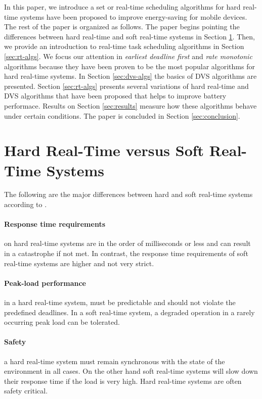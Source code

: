\documentclass[10pt,article]{IEEEtran}
\begin{document}
In this paper, we introduce a set or real-time scheduling algorithms for hard real-time systems have been proposed to improve energy-saving for mobile devices. The rest of the paper is organized as follows. The paper begins pointing the differences between hard real-time and soft real-time systems in Section \ref{sec:hardrt-vs-softrt}. Then, we provide an introduction to real-time task scheduling algorithms in Section \ref{sec:rt-algs}. We focus our attention in \emph{earliest deadline first} and \emph{rate monotonic} algorithms because they have been proven to be the most popular algorithms for hard real-time systems\cite{w-s-liu}. In Section \ref{sec:dvs-algs} the basics of DVS algorithms are presented. Section \ref{sec:rt-algs} presents several variations of hard real-time and DVS algorithms that have been proposed that helps to improve battery performace. Results on Section \ref{sec:results} measure how these algorithms behave under certain conditions. The paper is concluded in Section \ref{sec:conclusion}.  

\section{Hard Real-Time versus Soft Real-Time Systems} \label{sec:hardrt-vs-softrt}
The following are the major differences between hard and soft real-time systems according to \cite{juvva}. 
\paragraph{Response time requirements} on hard real-time systems are in the order of milliseconds or less and can result in a catastrophe if not met. In contrast, the response time requirements of soft real-time systems are higher and not very strict. 

\paragraph{Peak-load performance} in a hard real-time system, must be predictable and should not violate the predefined deadlines. In a soft real-time system, a degraded operation in a rarely occurring peak load can be tolerated. 

\paragraph{Safety} a hard real-time system must remain synchronous with the state of the environment in all cases. On the other hand soft real-time systems will slow down their response time if the load is very high. Hard real-time systems are often safety critical. 
\end{document}
